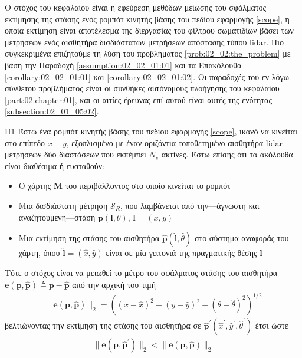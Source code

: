 Ο στόχος του κεφαλαίου είναι η εφεύρεση μεθόδων μείωσης του σφάλματος εκτίμησης
της στάσης ενός ρομπότ κινητής βάσης του πεδίου εφαρμογής \ref{scope}, η οποία
εκτίμηση είναι αποτέλεσμα της διεργασίας του φίλτρου σωματιδίων βάσει των
μετρήσεων ενός αισθητήρα δισδιάστατων μετρήσεων απόστασης τύπου lidar. Πιο
συγκεκριμένα επιζητούμε τη λύση του προβλήματος \ref{prob:02_02:the_problem}
με βάση την Παραδοχή \ref{assumption:02_02_01:01} και τα Επακόλουθα
\ref{corollary:02_02_01:01} και \ref{corollary:02_02_01:02}. Οι παραδοχές
του εν λόγω σύνθετου προβλήματος είναι οι συνθήκες αυτόνομους πλοήγησης
του κεφαλαίου \ref{part:02:chapter:01}, και οι αιτίες έρευνας επί αυτού
είναι αυτές της ενότητας \ref{subsection:02_01_05:02}.

\begin{bw_box}
\begin{customproblem}{Π1}
  \label{prob:02_02:the_problem}
  Έστω ένα ρομπότ κινητής βάσης του πεδίου εφαρμογής \ref{scope}, ικανό να
  κινείται στο επίπεδο $x-y$, εξοπλισμένο με έναν οριζόντια τοποθετημένο
  αισθητήρα lidar μετρήσεων δύο διαστάσεων που εκπέμπει $N_s$ ακτίνες. Έστω
  επίσης ότι τα ακόλουθα είναι διαθέσιμα ή ευσταθούν:
  \begin{itemize}
    \item Ο χάρτης $\bm{M}$ του περιβάλλοντος στο οποίο κινείται το ρομπότ
    \item Μια δισδιάστατη μέτρηση $\mathcal{S}_R$, που λαμβάνεται από
          την---άγνωστη και αναζητούμενη---στάση $\bm{p}(\bm{l},\theta)$,
          $\bm{l} = (x,y)$
    \item Μια εκτίμηση της στάσης του αισθητήρα
          $\hat{\bm{p}}(\hat{\bm{l}}, \hat{\theta})$ στο σύστημα αναφοράς του
          χάρτη, όπου $\hat{\bm{l}} = (\hat{x}, \hat{y})$ είναι σε μία γειτονιά
          της πραγματικής θέσης $\bm{l}$
  \end{itemize}
\end{customproblem}
Τότε ο στόχος είναι να μειωθεί το μέτρο του σφάλματος στάσης του αισθητήρα
$\bm{e}(\bm{p}, \hat{\bm{p}}) \triangleq \bm{p}- \hat{\bm{p}}$ από την αρχική
του τιμή
\begin{align}
  \|\bm{e}(\bm{p}, \hat{\bm{p}})\|_2 = ((x- \hat{x})^2 + (y- \hat{y})^2 + (\theta- \hat{\theta})^2)^{1/2}
  \label{eq:pose_error_def}
\end{align}
βελτιώνοντας την εκτίμηση της στάσης του αισθητήρα σε
$\hat{\bm{p}}^\prime(\hat{x}^\prime, \hat{y}^\prime, \hat{\theta}^\prime)$ έτσι ώστε
\begin{align}
  \|\bm{e}(\bm{p}, \hat{\bm{p}}^\prime)\|_2 < \|\bm{e}(\bm{p}, \hat{\bm{p}})\|_2
  \tag{$\ast$}
  \label{obj:the_objective}
\end{align}
\end{bw_box}
